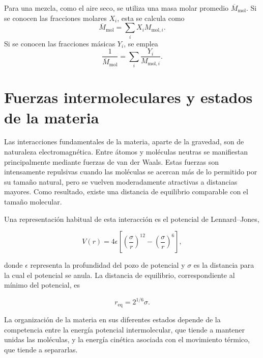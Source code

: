 Para una mezcla, como el aire seco, se utiliza una masa molar promedio
$\overline{M}_{\mathrm{mol}}$. Si se conocen las fracciones molares $X_i$, esta
se calcula como
$$
    \overline{M}_{\mathrm{mol}}
    = \sum_i X_i M_{\mathrm{mol},i}.
$$
Si se conocen las fracciones másicas $Y_i$, se emplea
$$
    \frac{1}{\overline{M}_{\mathrm{mol}}}
    = \sum_i \frac{Y_i}{M_{\mathrm{mol},i}}.
$$

\section{Fuerzas intermoleculares y estados de la materia}

Las interacciones fundamentales de la materia, aparte de la gravedad, son de
naturaleza electromagnética. Entre átomos y moléculas neutras se manifiestan
principalmente mediante fuerzas de van der Waals. Estas fuerzas son
intensamente repulsivas cuando las moléculas se acercan más de lo permitido por
su tamaño natural, pero se vuelven moderadamente atractivas a distancias
mayores. Como resultado, existe una distancia de equilibrio comparable con el
tamaño molecular.

Una representación habitual de esta interacción es el potencial de
Lennard--Jones,

$$
V(r)=4\epsilon\left[
\left(\frac{\sigma}{r}\right)^{12}
-\left(\frac{\sigma}{r}\right)^6
\right],
$$

donde $\epsilon$ representa la profundidad del pozo de potencial y $\sigma$ es
la distancia para la cual el potencial se anula. La distancia de equilibrio,
correspondiente al mínimo del potencial, es

$$
r_{\mathrm{eq}}=2^{1/6}\sigma.
$$

\figuraPotencialLennardJones

La organización de la materia en sus diferentes estados depende de la
competencia entre la energía potencial intermolecular, que tiende a mantener
unidas las moléculas, y la energía cinética asociada con el movimiento térmico,
que tiende a separarlas.

